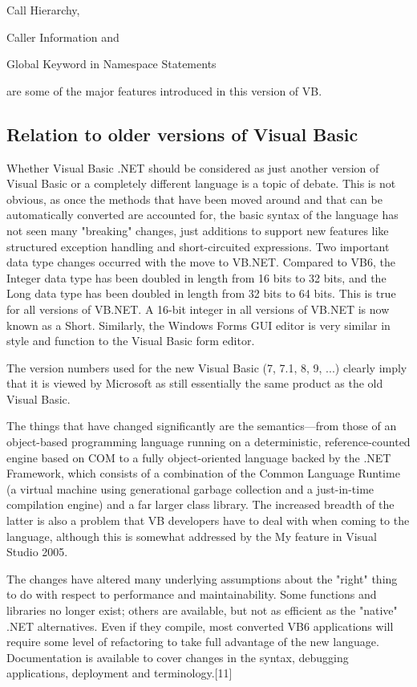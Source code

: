 Call Hierarchy, 

Caller Information and 

Global Keyword in Namespace Statements 

are some of the major features introduced in this version of VB.

\subsection{Relation to older versions of Visual Basic}

Whether Visual Basic .NET should be considered as just another version of Visual Basic or a completely different language is a topic of debate. This is not obvious, as once the methods that have been moved around and that can be automatically converted are accounted for, the basic syntax of the language has not seen many "breaking" changes, just additions to support new features like structured exception handling and short-circuited expressions. Two important data type changes occurred with the move to VB.NET. Compared to VB6, the Integer data type has been doubled in length from 16 bits to 32 bits, and the Long data type has been doubled in length from 32 bits to 64 bits. This is true for all versions of VB.NET. A 16-bit integer in all versions of VB.NET is now known as a Short. Similarly, the Windows Forms GUI editor is very similar in style and function to the Visual Basic form editor.

\vpara
The version numbers used for the new Visual Basic (7, 7.1, 8, 9, ...) clearly imply that it is viewed by Microsoft as still essentially the same product as the old Visual Basic.

\vpara
The things that have changed significantly are the semantics—from those of an object-based programming language running on a deterministic, reference-counted engine based on COM to a fully object-oriented language backed by the .NET Framework, which consists of a combination of the Common Language Runtime (a virtual machine using generational garbage collection and a just-in-time compilation engine) and a far larger class library. The increased breadth of the latter is also a problem that VB developers have to deal with when coming to the language, although this is somewhat addressed by the My feature in Visual Studio 2005.

\vpara
The changes have altered many underlying assumptions about the "right" thing to do with respect to performance and maintainability. Some functions and libraries no longer exist; others are available, but not as efficient as the "native" .NET alternatives. Even if they compile, most converted VB6 applications will require some level of refactoring to take full advantage of the new language. Documentation is available to cover changes in the syntax, debugging applications, deployment and terminology.[11]

